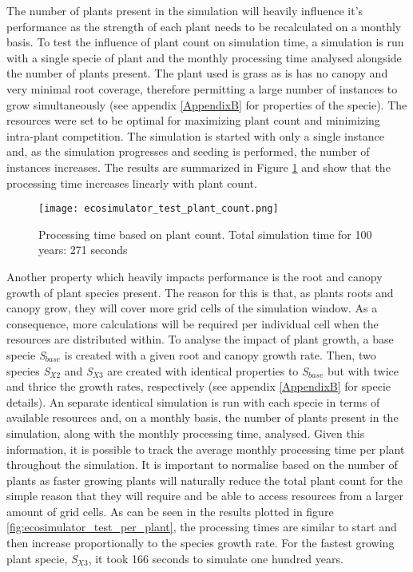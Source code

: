 The number of plants present in the simulation will heavily influence it's performance as the strength of each plant needs to be recalculated on a monthly basis. To test the influence of plant count on simulation time, a simulation is run with a single specie of plant and the monthly processing time analysed alongside the number of plants present. The plant used is grass as is has no canopy and very minimal root coverage, therefore permitting a large number of instances to grow simultaneously (see appendix \ref{AppendixB} for properties of the specie). The resources were set to be optimal for maximizing plant count and minimizing intra-plant competition. The simulation is started with only a single instance and, as the simulation progresses and seeding is performed, the number of instances increases. The results are summarized in Figure \ref{fig:ecosimulator_test_plant_count} and show that the processing time increases linearly with plant count. \\

\begin{figure}
\center
	\texttt{[image: ecosimulator\_test\_plant\_count.png]}
	\caption{ Processing time based on plant count. Total simulation time for 100 years: 271 seconds}	
	\label{fig:ecosimulator_test_plant_count}
\end{figure}

Another property which heavily impacts performance is the root and canopy growth of plant species present. The reason for this is that, as plants roots and canopy grow, they will cover more grid cells of the simulation window. As a consequence, more calculations will be required per individual cell when the resources are distributed within. To analyse the impact of plant growth, a base specie \textit{S$_{base}$} is created with a given root and canopy growth rate. Then, two species \textit{S$_{X2}$} and \textit{S$_{X3}$} are created with identical properties to \textit{S$_{base}$} but with twice and thrice the growth rates, respectively (see appendix \ref{AppendixB} for specie details). An separate identical simulation is run with each specie in terms of available resources and, on a monthly basis, the number of plants present in the simulation, along with the monthly processing time, analysed. Given this information, it is possible to track the average monthly processing time per plant throughout the simulation. It is important to normalise based on the number of plants as faster growing plants will naturally reduce the total plant count for the simple reason that they will require and be able to access resources from a larger amount of grid cells. As can be seen in the results plotted in figure \ref{fig:ecosimulator_test_per_plant}, the processing times are similar to start and then increase proportionally to the species growth rate. For the fastest growing plant specie, \textit{S$_{X3}$}, it took 166 seconds to simulate one hundred years.

